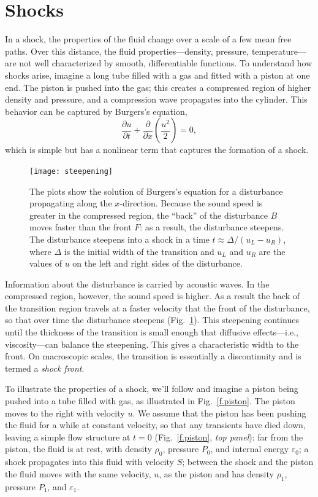 \section{Shocks}
\newcommand{\gpo}{\ensuremath{(\gamma+1)}}
\newcommand{\gmo}{\ensuremath{(\gamma-1)}}

In a shock, the properties of the fluid change over a scale of a few mean free paths.  Over this distance, the fluid properties---density, pressure, temperature---are not well characterized by smooth, differentiable functions. To understand how shocks arise, imagine a long tube filled with a gas and fitted with a piston at one end. The piston is pushed into the gas; this creates a compressed region of higher density and pressure, and a compression wave propagates into the cylinder.  This behavior can be captured by Burgers's equation,
\[ \frac{\partial u}{\partial t} + \frac{\partial}{\partial x}\left(\frac{u^{2}}{2}\right) = 0, \]
which is simple but has a nonlinear term that captures the formation of a shock.

\begin{figure}
\texttt{[image: steepening]}
\caption[A disturbance steepening as it propagates.]{The plots show the solution of Burgers's equation for a disturbance propagating along the $x$-direction.  Because the sound speed is greater in the compressed region, the ``back'' of the disturbance $B$ moves faster than the front $F$: as a result, the disturbance steepens.  The disturbance steepens into a shock in a time $t\approx \Delta/(u_{L}-u_{R})$, where $\Delta$ is the initial width of the transition and $u_{L}$ and $u_{R}$ are the values of $u$ on the left and right sides of the disturbance.  }
\label{f.steepening}
\end{figure}

Information about the disturbance is carried by acoustic waves.  In the compressed region, however, the sound speed is higher.  As a result the back of the transition region travels at a faster velocity that the front of the disturbance, so that over time the disturbance steepens (Fig.~\ref{f.steepening}). This steepening continues until the thickness of the transition is small enough that diffusive effects---i.e., viscosity---can balance the steepening.  This gives a characteristic width to the front.  On macroscopic scales, the transition is essentially a discontinuity and is termed a \emph{shock front}.


To illustrate the properties of a shock, we'll follow  and imagine a piston being pushed into a tube filled with gas, as illustrated in Fig.~\ref{f.piston}.  The piston moves to the right with velocity $u$.  We assume that the piston has been pushing the fluid for a while at constant velocity, so that any transients have died down, leaving a simple flow structure at $t=0$ (Fig.~\ref{f.piston}, \emph{top panel}): far from the piston, the fluid is at rest, with density $\rho_{0}$, pressure $P_{0}$, and internal energy $\varepsilon_{0}$; a shock propagates into this fluid with velocity $S$; between the shock and the piston the fluid moves with the same velocity, $u$, as the piston and has density $\rho_{1}$, pressure $P_{1}$, and $\varepsilon_{1}$.


